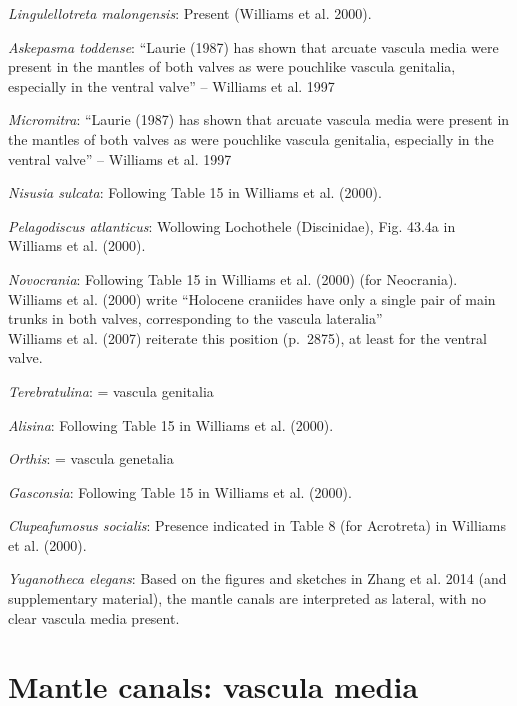 \documentclass[]{book}
\theoremstyle{definition}
\theoremstyle{definition}
\theoremstyle{definition}
\theoremstyle{remark}
\begin{document}
\emph{Lingulellotreta malongensis}: Present (Williams et al. 2000).

\emph{Askepasma toddense}: ``Laurie (1987) has shown that arcuate
vascula media were present in the mantles of both valves as were
pouchlike vascula genitalia, especially in the ventral valve'' --
Williams et al. 1997

\emph{Micromitra}: ``Laurie (1987) has shown that arcuate vascula media
were present in the mantles of both valves as were pouchlike vascula
genitalia, especially in the ventral valve'' -- Williams et al. 1997

\emph{Nisusia sulcata}: Following Table 15 in Williams et al. (2000).

\emph{Pelagodiscus atlanticus}: Wollowing Lochothele (Discinidae), Fig.
43.4a in Williams et al. (2000).

\emph{Novocrania}: Following Table 15 in Williams et al. (2000) (for
Neocrania).\\
Williams et al. (2000) write ``Holocene craniides have only a single
pair of main trunks in both valves, corresponding to the vascula
lateralia''\\
Williams et al. (2007) reiterate this position (p.~2875), at least for
the ventral valve.

\emph{Terebratulina}: = vascula genitalia

\emph{Alisina}: Following Table 15 in Williams et al. (2000).

\emph{Orthis}: = vascula genetalia

\emph{Gasconsia}: Following Table 15 in Williams et al. (2000).

\emph{Clupeafumosus socialis}: Presence indicated in Table 8 (for
Acrotreta) in Williams et al. (2000).

\emph{Yuganotheca elegans}: Based on the figures and sketches in Zhang
et al. 2014 (and supplementary material), the mantle canals are
interpreted as lateral, with no clear vascula media present.

\hypertarget{mantle-canals-vascula-media}{%
\section*{Mantle canals: vascula
media}\label{mantle-canals-vascula-media}}
\end{document}
